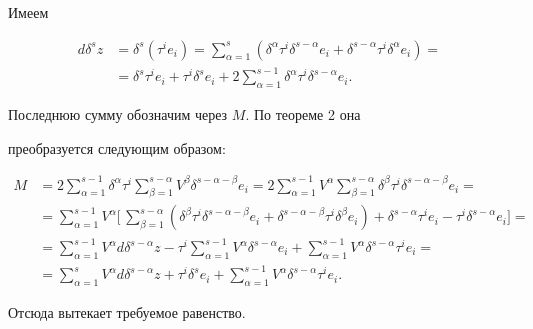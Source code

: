 \begin{pf} Имеем


\begin{align*}


d\delta^sz &=\delta^s(\tau^ie_i)=


\sum_{\alpha=1}^{s}(\delta^{\alpha}\tau^i\delta^{s-\alpha}e_i+


\delta^{s-\alpha}\tau^i\delta^{\alpha}e_i)=\\


&=\delta^s\tau^ie_i+\tau^i\delta^se_i+


2\sum_{\alpha=1}^{s-1}\delta^{\alpha}\tau^i\delta^{s-\alpha}e_i.


\end{align*}


Последнюю сумму обозначим через $M$. По теореме 2 она


преобразуется следующим образом:


\begin{align*}


M&=2\sum_{\alpha=1}^{s-1}\delta^{\alpha}\tau^i\sum_{\beta=1}^{s-\alpha}


V^{\beta}\delta^{s-\alpha-\beta}e_i=


2\sum_{\alpha=1}^{s-1}V^{\alpha}\sum_{\beta=1}^{s-\alpha}\delta^{\beta}


\tau^i\delta^{s-\alpha-\beta}e_i=\\


&=\sum_{\alpha=1}^{s-1}V^{\alpha}\biggl[\,\sum_{\beta=1}^{s-\alpha}(


\delta^{\beta}\tau^i\delta^{s-\alpha-\beta}e_i+


\delta^{s-\alpha-\beta}\tau^i\delta^{\beta}e_i)+


\delta^{s-\alpha}\tau^ie_i-\tau^i\delta^{s-\alpha}e_i\biggr]=\\


&=\sum_{\alpha=1}^{s-1}V^{\alpha}d\delta^{s-\alpha}z-\tau^i


\sum_{\alpha=1}^{s-1}V^{\alpha}\delta^{s-\alpha}e_i+


\sum_{\alpha=1}^{s-1}V^{\alpha}\delta^{s-\alpha}\tau^ie_i=\\


&=\sum_{\alpha=1}^{s}V^{\alpha}d\delta^{s-\alpha}z+\tau^i\delta^se_i+


\sum_{\alpha=1}^{s-1}V^{\alpha}\delta^{s-\alpha}\tau^ie_i.


\end{align*}


Отсюда вытекает требуемое равенство.


\end{pf}





